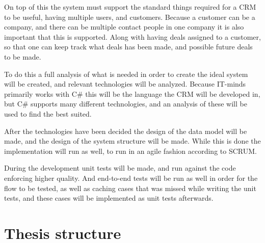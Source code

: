 On top of this the system must support the standard things required for a CRM to be useful,
having multiple users, and customers. Because a customer can be a company, and
there can be multiple contact people in one company it is also important that this
is supported. Along with having deals assigned to a customer, so that one can keep track
what deals has been made, and possible future deals to be made.

To do this a full analysis of what is needed in order to create the ideal system
will be created, and relevant technologies will be analyzed. Because IT-minds primarily
works with C\# this will be the language the CRM will be developed in, but C\# supports
many different technologies, and an analysis of these will be used to find the best suited.

After the technologies have been decided the design of the data model will be made, and the design of the system structure will be made. While this is done the implementation will run as well, to run in an agile fashion according to SCRUM.

During the development unit tests will be made, and run against the code enforcing higher quality.
And end-to-end tests will be run as well in order for the flow to be tested, as well as caching cases that was missed while writing the unit tests, and these cases will be implemented as unit tests afterwards.

\section{Thesis structure}
\label{sec:Thesis structure}
